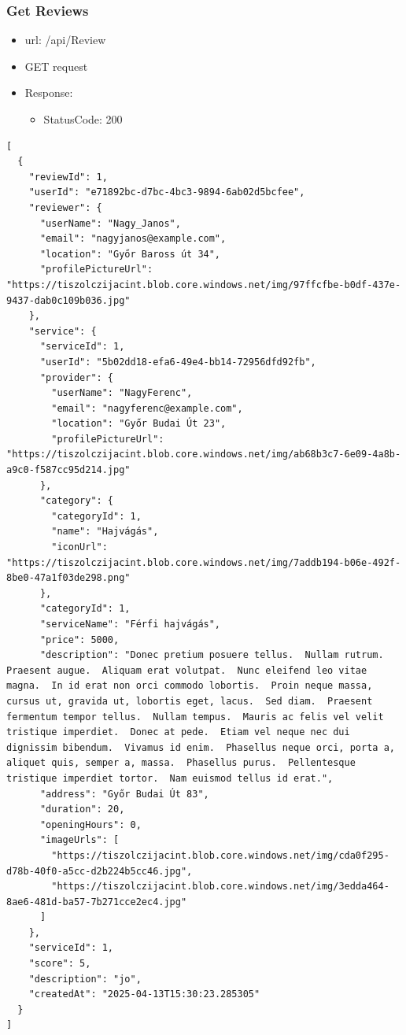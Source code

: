 \documentclass[11pt]{article}
\begin{document}
\subsubsection{Get Reviews}
\label{sec:orgc34d4d8}
\begin{itemize}
\item url: /api/Review
\item GET request
\item Response:
\begin{itemize}
\item StatusCode: 200
\end{itemize}
\end{itemize}
\begin{verbatim}
[
  {
    "reviewId": 1,
    "userId": "e71892bc-d7bc-4bc3-9894-6ab02d5bcfee",
    "reviewer": {
      "userName": "Nagy_Janos",
      "email": "nagyjanos@example.com",
      "location": "Győr Baross út 34",
      "profilePictureUrl": "https://tiszolczijacint.blob.core.windows.net/img/97ffcfbe-b0df-437e-9437-dab0c109b036.jpg"
    },
    "service": {
      "serviceId": 1,
      "userId": "5b02dd18-efa6-49e4-bb14-72956dfd92fb",
      "provider": {
        "userName": "NagyFerenc",
        "email": "nagyferenc@example.com",
        "location": "Győr Budai Út 23",
        "profilePictureUrl": "https://tiszolczijacint.blob.core.windows.net/img/ab68b3c7-6e09-4a8b-a9c0-f587cc95d214.jpg"
      },
      "category": {
        "categoryId": 1,
        "name": "Hajvágás",
        "iconUrl": "https://tiszolczijacint.blob.core.windows.net/img/7addb194-b06e-492f-8be0-47a1f03de298.png"
      },
      "categoryId": 1,
      "serviceName": "Férfi hajvágás",
      "price": 5000,
      "description": "Donec pretium posuere tellus.  Nullam rutrum.  Praesent augue.  Aliquam erat volutpat.  Nunc eleifend leo vitae magna.  In id erat non orci commodo lobortis.  Proin neque massa, cursus ut, gravida ut, lobortis eget, lacus.  Sed diam.  Praesent fermentum tempor tellus.  Nullam tempus.  Mauris ac felis vel velit tristique imperdiet.  Donec at pede.  Etiam vel neque nec dui dignissim bibendum.  Vivamus id enim.  Phasellus neque orci, porta a, aliquet quis, semper a, massa.  Phasellus purus.  Pellentesque tristique imperdiet tortor.  Nam euismod tellus id erat.",
      "address": "Győr Budai Út 83",
      "duration": 20,
      "openingHours": 0,
      "imageUrls": [
        "https://tiszolczijacint.blob.core.windows.net/img/cda0f295-d78b-40f0-a5cc-d2b224b5cc46.jpg",
        "https://tiszolczijacint.blob.core.windows.net/img/3edda464-8ae6-481d-ba57-7b271cce2ec4.jpg"
      ]
    },
    "serviceId": 1,
    "score": 5,
    "description": "jo",
    "createdAt": "2025-04-13T15:30:23.285305"
  }
]
\end{verbatim}
\end{document}
